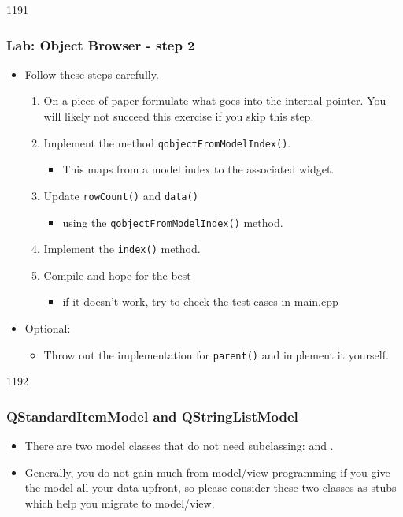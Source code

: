 \begin{slide}{1191}\frametitle{Lab: Object Browser - step 2}
\label{model_view_exercise_step2}
\begin{itemize}
\item Follow these steps carefully.
  \begin{enumerate}
  \item On a piece of paper formulate what goes into the internal
    pointer. You will likely not succeed this exercise if you skip this
    step.
  \item Implement the method \texttt{qobjectFromModelIndex()}.
    \begin{itemize}
    \item This maps from a model index to the associated widget.
    \end{itemize}
  \item Update \texttt{rowCount()} and
    \texttt{data()}
    \begin{itemize}
    \item using the \texttt{qobjectFromModelIndex()} method.
    \end{itemize}
  \item Implement the \texttt{index()} method.
  \item Compile and hope for the best
    \begin{itemize}
    \item if it doesn't work, try to check the
      test cases in main.cpp
    \end{itemize}
  \end{enumerate}
\item Optional:
  \begin{itemize}
  \item Throw out the implementation for \texttt{parent()}
    and implement it yourself.
  \end{itemize}
\end{itemize}
\end{slide}

\begin{slide}[fragile]{1192}\frametitle{QStandardItemModel and QStringListModel}
\begin{itemize}
\item There are two model classes that do not need subclassing:
   and .
\item Generally, you do not gain much from model/view programming if you
  give the model all your data upfront, so please consider these two
  classes as stubs which help you migrate to model/view.
\end{itemize}
\end{slide}

